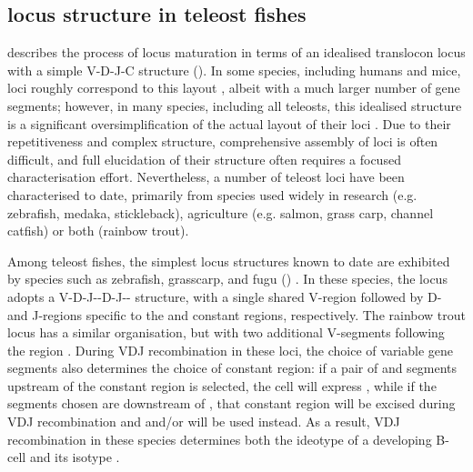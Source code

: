 \subsection{\igh{} locus structure in teleost fishes}
\label{sec:intro_teleost_loci}

 describes the process of \igh{} locus maturation in terms of an idealised translocon locus with a simple V-D-J-C structure (). In some species, including humans and mice, \igh{} loci roughly correspond to this layout \parencite{jung2006vdjr}, albeit with a much larger number of gene segments; however, in many species, including all teleosts, this idealised structure is a significant oversimplification of the actual layout of their \igh{} loci \parencite{fillatreau2013astonishing}. Due to their repetitiveness and complex structure, comprehensive assembly of \igh{} loci is often difficult, and full elucidation of their structure often requires a focused characterisation effort. Nevertheless, a number of teleost loci have been characterised to date, primarily from species used widely in research (e.g. zebrafish, medaka, stickleback), agriculture (e.g. salmon, grass carp, channel catfish) or both (rainbow trout).

Among teleost fishes, the simplest \igh{} locus structures known to date are exhibited by species such as zebrafish, grasscarp, and fugu () \parencite{fillatreau2013astonishing}. In these species, the \igh{} locus adopts a V-D-J-\cz{}-D-J-\cm{}-\cd{} structure, with a single shared V-region followed by D- and J-regions specific to the  and  constant regions, respectively. The rainbow trout locus has a similar organisation, but with two additional V-segments following the  region \parencite{hansen2005trout}. During VDJ recombination in these loci, the choice of variable gene segments also determines the choice of constant region: if a pair of \dh and \jh segments upstream of the  constant region is selected, the cell will express , while if the segments chosen are downstream of , that constant region will be excised during VDJ recombination and  and/or  will be used instead. As a result, VDJ recombination in these species determines both the ideotype of a developing B-cell and its isotype \parencite{fillatreau2013astonishing}.

